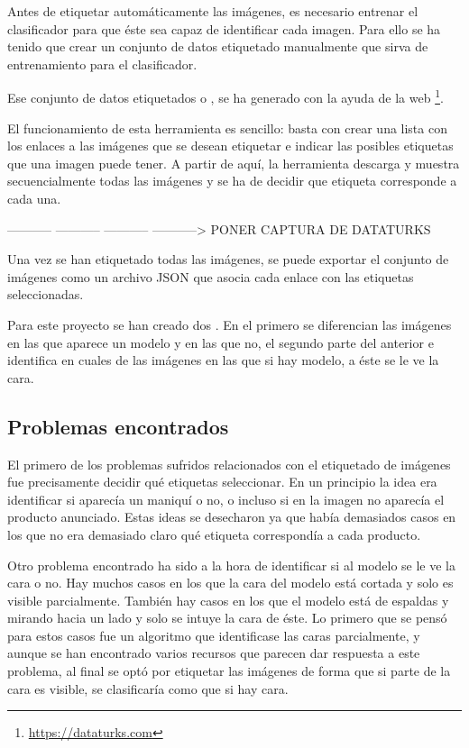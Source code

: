 Antes de etiquetar automáticamente las imágenes, es necesario entrenar el clasificador para que éste sea capaz de identificar cada imagen. Para ello se ha tenido que crear un conjunto de datos etiquetado manualmente que sirva de entrenamiento para el clasificador.

Ese conjunto de datos etiquetados o , se ha generado con la ayuda de la web \footnote{\url{https://dataturks.com}}.

El funcionamiento de esta herramienta es sencillo: basta con crear una lista con los enlaces a las imágenes que se desean etiquetar e indicar las posibles etiquetas que una imagen puede tener. A partir de aquí, la herramienta descarga y muestra secuencialmente todas las imágenes y se ha de decidir que etiqueta corresponde a cada una.

-----------
-----------
-----------
-----------> PONER CAPTURA DE DATATURKS

Una vez se han etiquetado todas las imágenes, se puede exportar el conjunto de imágenes como un archivo JSON que asocia cada enlace con las etiquetas seleccionadas.

Para este proyecto se han creado dos . En el primero se diferencian las imágenes en las que aparece un modelo y en las que no, el segundo  parte del anterior e identifica en cuales de las imágenes en las que si hay modelo, a éste se le ve la cara.

\subsection{Problemas encontrados}

El primero de los problemas sufridos relacionados con el etiquetado de imágenes fue precisamente decidir qué etiquetas seleccionar. En un principio la idea era identificar si aparecía un maniquí o no, o incluso si en la imagen no aparecía el producto anunciado. Estas ideas se desecharon ya que había demasiados casos en los que no era demasiado claro qué etiqueta correspondía a cada producto.

Otro problema encontrado ha sido a la hora de identificar si al modelo se le ve la cara o no. Hay muchos casos en los que la cara del modelo está cortada y solo es visible parcialmente. También hay casos en los que el modelo está de espaldas y mirando hacia un lado y solo se intuye la cara de éste. Lo primero que se pensó para estos casos fue un algoritmo que identificase las caras parcialmente, y aunque se han encontrado varios recursos que parecen dar respuesta a este problema, al final se optó por etiquetar las imágenes de forma que si parte de la cara es visible, se clasificaría como que si hay cara.

